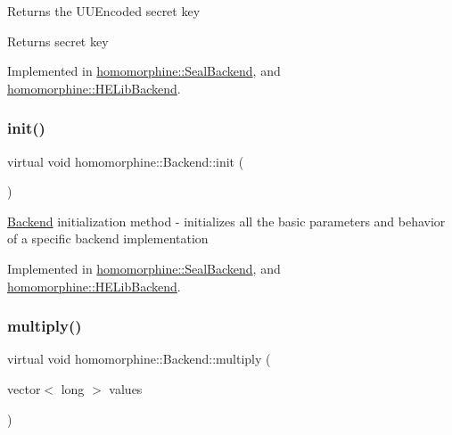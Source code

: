 Returns the U\+U\+Encoded secret key

\begin{DoxyReturn}{Returns}
secret key 
\end{DoxyReturn}


Implemented in \mbox{\hyperlink{classhomomorphine_1_1_seal_backend_a8ad57a68eb8a02d162ba439046565471}{homomorphine\+::\+Seal\+Backend}}, and \mbox{\hyperlink{classhomomorphine_1_1_h_e_lib_backend_a57af39a901a44fef6aad76503739fde4}{homomorphine\+::\+H\+E\+Lib\+Backend}}.

\mbox{\label{classhomomorphine_1_1_backend_a8ac9e6b5d747ecd4db48d1bf1c1b7a8c}} 
\subsubsection{\texorpdfstring{init()}{init()}}
{\footnotesize\ttfamily virtual void homomorphine\+::\+Backend\+::init (\begin{DoxyParamCaption}{ }\end{DoxyParamCaption})\hspace{0.3cm}{\ttfamily [pure virtual]}}

\mbox{\hyperlink{classhomomorphine_1_1_backend}{Backend}} initialization method -\/ initializes all the basic parameters and behavior of a specific backend implementation 

Implemented in \mbox{\hyperlink{classhomomorphine_1_1_seal_backend_a106556100ae5f2e9dadfa9fc64603d94}{homomorphine\+::\+Seal\+Backend}}, and \mbox{\hyperlink{classhomomorphine_1_1_h_e_lib_backend_a6a7e7c8095f2287c41f7d93be91418ec}{homomorphine\+::\+H\+E\+Lib\+Backend}}.

\mbox{\label{classhomomorphine_1_1_backend_a716a0d366daf9a6491ba4d33ebb57d41}} 
\subsubsection{\texorpdfstring{multiply()}{multiply()}\hspace{0.1cm}{\footnotesize\ttfamily [1/2]}}
{\footnotesize\ttfamily virtual void homomorphine\+::\+Backend\+::multiply (\begin{DoxyParamCaption}\item[{vector$<$ long $>$}]{values }\end{DoxyParamCaption})\hspace{0.3cm}{\ttfamily [pure virtual]}}

